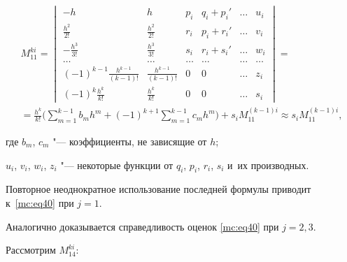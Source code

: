 \begin{multline}

\label{mc:eq41}

M_{11}^{ki}=

\begin{vmatrix}

      -h & h & p_i & q_i+p_i'  & \dots  & u_i

   \\

      \frac{h^2}{2!} &   \frac{h^2}{2!} & r_i & p_i+r_i'& \dots  & v_i

   \\

      -\frac{h^3}{3!} &   \frac{h^3}{3!} & s_i & r_i+s_i'& \dots  & w_i

    \\

     \dots & \dots & \dots & \dots  & \dots & \dots

   \\

     (-1)^{k-1}\frac{h^{k-1}}{\left(k-1\right)!} &   \frac{h^{k-1}}{\left(k-1\right)!} & 0 & 0 & \dots &  z_i

   \\

     (-1)^{k}\frac{h^{k}}{k!} &   \frac{h^{k}}{k!} & 0 & 0 & \dots &  s_i

 \end{vmatrix}

 =

 \\

   =\frac{h^{k}}{k!}\biggl(\sum_{m=1}^{k-1}b_mh^m+(-1)^{k+1}\sum_{m=1}^{k-1}c_mh^m\biggr)+

   s_iM_{11}^{(k-1)i}\approx s_iM_{11}^{(k-1)i},

\end{multline}

где $b_m$,  $c_m$ "--- коэффициенты, не зависящие от $h$; 

$u_i$,  $v_i$,  $w_i$,  $z_i$ "--- некоторые функции от $q_i$,  $p_i$,  $r_i$,  $s_i$  и~их производных.

Повторное неоднократное использование  последней формулы приводит к~\eqref{mc:eq40} при $j=1$.



 Аналогично доказывается справедливость оценок \eqref{mc:eq40} при $j=2,  3$.



Рассмотрим $   M_{14}^{ki}$:



